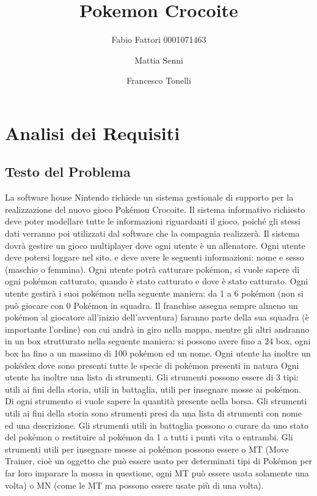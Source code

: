 \documentclass{article}
\title{Pokemon Crocoite}
\author{Fabio Fattori 0001071463 \and Mattia Senni \and Francesco Tonelli}
\date{}
\begin{document}
\maketitle

\tableofcontents

\section{Analisi dei Requisiti}
\subsection{Testo del Problema}
La software house Nintendo richiede un sistema gestionale di supporto per la realizzazione del nuovo gioco Pokémon Crocoite. 
Il sistema informativo richiesto deve poter modellare tutte le informazioni riguardanti il gioco, poiché gli stessi dati verranno poi utilizzati dal software che la compagnia realizzerà. Il sistema dovrà gestire un gioco multiplayer dove ogni utente è un allenatore.
Ogni utente deve potersi loggare nel sito, e deve avere le seguenti informazioni: nome e sesso (maschio o femmina).
Ogni utente potrà catturare pokémon, si vuole sapere di ogni pokémon catturato, quando è stato catturato e dove è stato catturato.
Ogni utente gestirà i suoi pokémon nella seguente maniera:
da 1 a 6 pokémon (non si può giocare con 0 Pokémon in squadra. Il franchise assegna sempre almeno un pokémon al giocatore all’inizio dell’avventura) faranno parte della sua squadra (è importante l’ordine) con cui andrà in giro nella mappa, mentre gli altri andranno in un box strutturato nella seguente maniera: si possono avere fino a 24 box, ogni box ha fino a un massimo di 100 pokémon ed un nome.
Ogni utente ha inoltre un pokédex dove sono presenti tutte le specie di pokémon presenti in natura
Ogni utente ha inoltre una lista di strumenti.
Gli strumenti possono essere di 3 tipi: utili ai fini della storia, utili in battaglia, utili per insegnare mosse ai pokémon.
Di ogni strumento si vuole sapere la quantità presente nella borsa.
Gli strumenti utili ai fini della storia sono strumenti presi da una lista di strumenti con nome ed una descrizione.
Gli strumenti utili in battaglia possono o curare da uno stato del pokémon o restituire al pokémon da 1 a tutti i punti vita o entrambi.
Gli strumenti utili per insegnare mosse ai pokémon possono essere o  MT (Move Trainer, cioè un oggetto che può essere usato per determinati tipi di Pokémon per far loro imparare la mossa in questione, ogni MT può essere usata solamente una volta) o MN (come le MT ma possono essere usate più di una volta).
\end{document}
